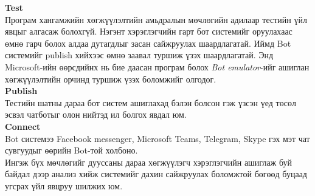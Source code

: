 \textbf{Test}
\\Програм хангамжийн хөгжүүлэлтийн амьдралын мөчлөгийн адилаар тестийн үйл явцыг алгасаж болохгүй. Нэгэнт хэрэглэгчийн гарт бот системийг оруулахаас өмнө гарч болох алдаа дутагдлыг засан сайжруулах шаардлагатай.  Иймд Bot системийг publish хийхээс өмнө заавал туршиж үзэх шаардлагатай. Энд Microsoft-ийн өөрсдийнх нь бие даасан програм болох \textit{Bot emulator}-ийг ашиглан хөгжүүлэлтийн орчинд туршиж үзэх боломжийг олгодог. 
\\\textbf{Publish}
\\Тестийн шатны дараа бот систем ашиглахад бэлэн болсон гэж үзсэн үед төсөл эсвэл чатботыг олон нийтэд ил болгох явдал юм. 
\\\textbf{Connect}
\\Bot системээ Facebook messenger, Microsoft Teams, Telegram, Skype гэх мэт чат сувгуудыг өөрийн Bot-той холбоно.
\\Ингэж бүх мөчлөгийг дууссаны дараа хөгжүүлэгч хэрэглэгчийн ашиглаж буй байдал дээр анализ хийж системийг дахин сайжруулах боломжтой бөгөөд буцаад угсрах үйл явцруу шилжих юм. 